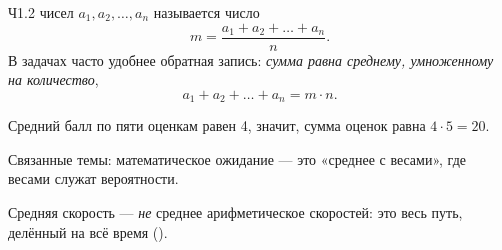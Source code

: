 
\begin{tema}{Ч1.2}
 чисел $a_1, a_2, \dots, a_n$ называется число
\[
  m=\frac{a_1+a_2+\dots+a_n}{n}.
\]
В задачах часто удобнее обратная запись: \emph{сумма равна среднему, умноженному на количество},
\[
  a_1+a_2+\dots+a_n=m\cdot n.
\]

\begin{primer}
Средний балл по пяти оценкам равен 4, значит, сумма оценок равна $4\cdot5=20$.
\end{primer}

Связанные темы: математическое ожидание  — это «среднее с весами»,
где весами служат вероятности.

\begin{oshibka}
Средняя скорость — \emph{не} среднее арифметическое скоростей:
это весь путь, делённый на всё время ().
\end{oshibka}
\end{tema}
